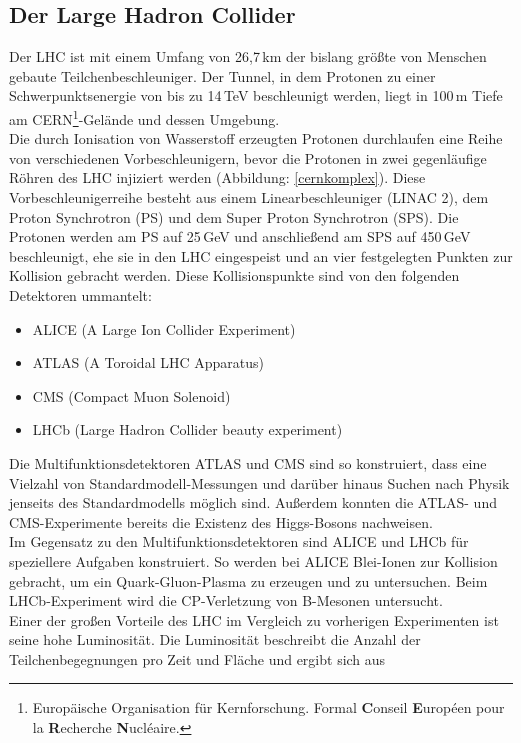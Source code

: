 \subsection{Der Large Hadron Collider}
Der LHC ist mit einem Umfang von 26,7\,km der bislang größte von Menschen gebaute Teilchenbeschleuniger. Der Tunnel, in dem Protonen zu einer Schwerpunktsenergie von bis zu 14\,TeV beschleunigt werden,
liegt in 100\,m Tiefe am CERN\footnote{Europäische Organisation für Kernforschung. Formal \textbf{C}onseil \textbf{E}uropéen pour la \textbf{R}echerche \textbf{N}ucléaire.}-Gelände und dessen Umgebung.\\
Die durch Ionisation von Wasserstoff erzeugten Protonen \cite{duoplasma} durchlaufen eine Reihe von verschiedenen Vorbeschleunigern, bevor die Protonen in zwei gegenläufige Röhren des LHC injiziert werden (Abbildung: \ref{cernkomplex}). 
Diese Vor\-be\-schleuniger\-reihe besteht aus einem Linearbeschleuniger (LINAC 2), dem Proton Synchrotron (PS) und dem Super Proton Synchrotron (SPS). Die Protonen werden am PS auf 25\,GeV und 
anschließend am SPS auf 450\,GeV beschleunigt, ehe sie in den LHC eingespeist und an vier festgelegten Punkten zur Kollision gebracht werden. Diese Kollisionspunkte sind von den folgenden Detektoren ummantelt:
\begin{itemize}
\item ALICE (A Large Ion Collider Experiment)
\item ATLAS (A Toroidal LHC Apparatus)
\item CMS (Compact Muon Solenoid)
\item LHCb (Large Hadron Collider beauty experiment)
\end{itemize}
Die Multifunktionsdetektoren ATLAS \cite{atlas} und CMS sind so konstruiert, dass eine Vielzahl von Standardmodell-Messungen und darüber hinaus Suchen nach Physik jenseits des Standardmodells möglich sind. Außerdem konnten die ATLAS- und CMS-Experimente bereits die Existenz des Higgs-Bosons nachweisen.\\
Im Gegensatz zu den Multifunktionsdetektoren sind ALICE \cite{alice} und LHCb \cite{lhcb} für speziellere Aufgaben konstruiert. So werden bei ALICE Blei-Ionen zur Kollision gebracht, um ein Quark-Gluon-Plasma zu erzeugen und zu untersuchen. Beim LHCb-Experiment wird die CP-Verletzung von B-Mesonen untersucht.
\\
Einer der großen Vorteile des LHC im Vergleich zu vorherigen Experimenten ist seine hohe Luminosität. Die Luminosität beschreibt die Anzahl der Teilchenbegegnungen pro Zeit und Fläche und ergibt sich aus
